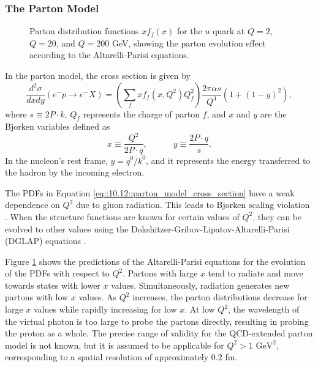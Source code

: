 \subsubsection{The Parton Model}
\label{10.12::parton_model}
    \begin{figure}[t!]
        \caption[$Q^2$ dependence of $x$ PDF for the $u$ quark.]
        {Parton distribution functions $xf_f(x)$ for the $u$ quark at $Q = 2$, $Q = 20$, and $Q = 200$ GeV, showing the parton evolution effect according to the Altarelli-Parisi equations.}
        \label{fig::10.12::q2_dependence}
    \end{figure}

    In the parton model, the cross section is given by
    \begin{equation}
        \frac{d^2\sigma}{dxdy} \left( e^-p \rightarrow e^-X \right) =
            \left( \sum_f xf_f \left( x, Q^2 \right) Q_f^2 \right)
            \frac{2\pi\alpha s}{Q^4} \left( 1 + \left( 1 - y \right)^2 \right),
        \label{eq::10.12::parton_model_cross_section}
    \end{equation}
    where $s \equiv 2P\cdot k$, $Q_f$ represents the charge of parton $f$, and $x$ and $y$ are the Bjorken variables defined as
    \begin{equation*}
        x \equiv \frac{Q^2}{2P\cdot q}, \hspace{36pt} y \equiv \frac{2 P\cdot q}{s}.
    \end{equation*}
    In the nucleon's rest frame, $y = q^0/k^0$, and it represents the energy transferred to the hadron by the incoming electron.

    The PDFs in Equation \eqref{eq::10.12::parton_model_cross_section} have a weak dependence on $Q^2$ due to gluon radiation.
    This leads to Bjorken scaling violation \cite{halzen1991}.
    When the structure functions are known for certain values of $Q^2$, they can be evolved to other values using the Dokshitzer-Gribov-Lipatov-Altarelli-Parisi (DGLAP) equations \cite{dokshitzer1991}.

    Figure \ref{fig::10.12::q2_dependence} shows the predictions of the Altarelli-Parisi equations for the evolution of the PDFs with respect to $Q^2$.
    Partons with large $x$ tend to radiate and move towards states with lower $x$ values.
    Simultaneously, radiation generates new partons with low $x$ values.
    As $Q^2$ increases, the parton distributions decrease for large $x$ values while rapidly increasing for low $x$.
    At low $Q^2$, the wavelength of the virtual photon is too large to probe the partons directly, resulting in probing the proton as a whole.
    The precise range of validity for the QCD-extended parton model is not known, but it is assumed to be applicable for $Q^2 > 1 \text{ GeV}^2$, corresponding to a spatial resolution of approximately $0.2$ fm.
